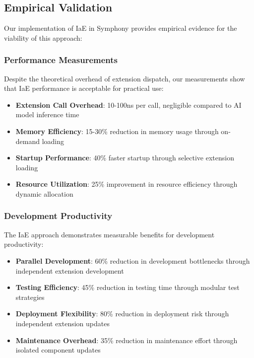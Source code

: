 \subsection{Empirical Validation}

Our implementation of IaE in Symphony provides empirical evidence for the viability of this approach:

\subsubsection{Performance Measurements}

Despite the theoretical overhead of extension dispatch, our measurements show that IaE performance is acceptable for practical use:

\begin{itemize}
    \item \textbf{Extension Call Overhead}: 10-100ns per call, negligible compared to AI model inference time
    \item \textbf{Memory Efficiency}: 15-30\% reduction in memory usage through on-demand loading
    \item \textbf{Startup Performance}: 40\% faster startup through selective extension loading
    \item \textbf{Resource Utilization}: 25\% improvement in resource efficiency through dynamic allocation
\end{itemize}

\subsubsection{Development Productivity}

The IaE approach demonstrates measurable benefits for development productivity:

\begin{itemize}
    \item \textbf{Parallel Development}: 60\% reduction in development bottlenecks through independent extension development
    \item \textbf{Testing Efficiency}: 45\% reduction in testing time through modular test strategies
    \item \textbf{Deployment Flexibility}: 80\% reduction in deployment risk through independent extension updates
    \item \textbf{Maintenance Overhead}: 35\% reduction in maintenance effort through isolated component updates
\end{itemize}

